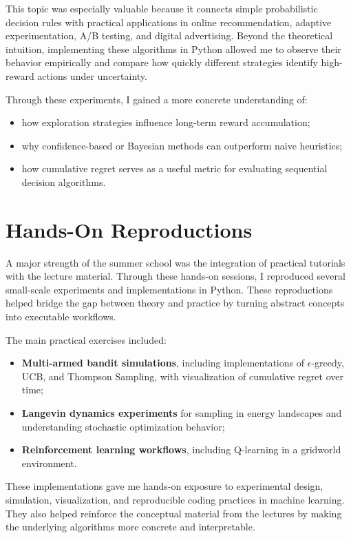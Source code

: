 \documentclass[11pt,a4paper]{article}
\begin{document}
This topic was especially valuable because it connects simple probabilistic decision rules with practical applications in online recommendation, adaptive experimentation, A/B testing, and digital advertising. Beyond the theoretical intuition, implementing these algorithms in Python allowed me to observe their behavior empirically and compare how quickly different strategies identify high-reward actions under uncertainty.

Through these experiments, I gained a more concrete understanding of:
\begin{itemize}
    \item how exploration strategies influence long-term reward accumulation;
    \item why confidence-based or Bayesian methods can outperform naive heuristics;
    \item how cumulative regret serves as a useful metric for evaluating sequential decision algorithms.
\end{itemize}

\section{Hands-On Reproductions}
A major strength of the summer school was the integration of practical tutorials with the lecture material. Through these hands-on sessions, I reproduced several small-scale experiments and implementations in Python. These reproductions helped bridge the gap between theory and practice by turning abstract concepts into executable workflows.

The main practical exercises included:
\begin{itemize}
    \item \textbf{Multi-armed bandit simulations}, including implementations of $\epsilon$-greedy, UCB, and Thompson Sampling, with visualization of cumulative regret over time;
    \item \textbf{Langevin dynamics experiments} for sampling in energy landscapes and understanding stochastic optimization behavior;
    \item \textbf{Reinforcement learning workflows}, including Q-learning in a gridworld environment.
\end{itemize}

These implementations gave me hands-on exposure to experimental design, simulation, visualization, and reproducible coding practices in machine learning. They also helped reinforce the conceptual material from the lectures by making the underlying algorithms more concrete and interpretable.
\end{document}
